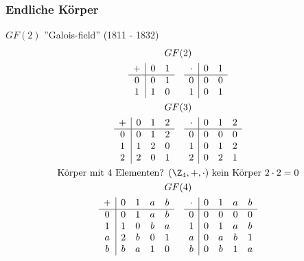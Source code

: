 \subsubsection{Endliche Körper}
$GF(2)$ ''Galois-field'' (1811 - 1832) \\
\begin{gather*}
	GF(2) \\
	\begin{array}{ c | c c }
		+	&0	&1	\\ \hline
		0	&0	&1	\\
		1	&1	&0	
	\end{array} \quad \begin{array}{ c | c c }
		\cdot	&0	&1	\\ \hline
		0	&0	&0	\\
		1	&0	&1	
	\end{array} \\
	GF(3) \\
	\begin{array}{ c | c c c }
		+	&0	&1	&2	\\ \hline
		0	&0	&1	&2	\\
		1	&1	&2	&0	\\
		2	&2	&0	&1
	\end{array} \quad \begin{array}{ c | c c c }
		\cdot	&0	&1	&2	\\ \hline
		0	&0	&0	&0	\\
		1	&0	&1	&2	\\
		2	&0	&2	&1	
	\end{array} \\
	\text{Körper mit 4 Elementen? } (\Z_4,+,\cdot) \text{ kein Körper } 2 \cdot 2 = 0 \\
	GF(4) \\
	\begin{array}{ c | c c c c }
		+	&0	&1	&a	&b	\\ \hline
		0	&0	&1	&a	&b	\\
		1	&1	&0	&b	&a	\\
		a	&2	&b	&0	&1	\\
		b	&b	&a	&1	&0	
	\end{array} \quad \begin{array}{ c | c c c c }
		\cdot	&0	&1	&a	&b	\\ \hline
		0	&0	&0	&0	&0	\\
		1	&0	&1	&a	&b	\\
		a	&0	&a	&b	&1	\\
		b	&0	&b	&1	&a	
	\end{array}
\end{gather*}
